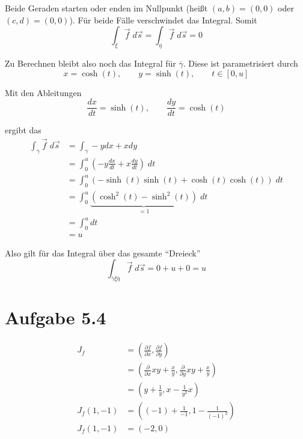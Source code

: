 \documentclass[a4paper,german,12pt,smallheadings]{scrartcl}
\begin{document}
\begin{enumerate}[(1)]
    Beide Geraden starten oder enden im Nullpunkt (heißt $(a,b) = (0,0)$ oder $(c,d) =
    (0,0)$). Für beide Fälle verschwindet das Integral. Somit
    \begin{equation*}
      \int_{\overline{\xi}} \vec{f} \; d\vec{s} = \int_{\overline{\eta}} \vec{f} \; d\vec{s} = 0
    \end{equation*}

    Zu Berechnen bleibt also noch das Integral für $\overline{\gamma}$. Diese ist parametrisiert durch
    \begin{equation*}
      x = \cosh(t),\qquad y = \sinh(t), \qquad t \in [0,u]
    \end{equation*}

    Mit den Ableitungen
    \begin{equation*}
      \frac{dx}{dt} = \sinh(t), \qquad \frac{dy}{dt} = \cosh(t)
    \end{equation*}

    ergibt das
    \begin{align*}
      \int_{\overline{\gamma}} \vec{f} \; d\vec{s} &=  \int_{\overline{\gamma}} -y dx + x dy \\ 
                                                   &= \int_0^u \left(-y \frac{dx}{dt} + x \frac{dy}{dt}\right) \; dt \\
                                                   &= \int_0^u \left(-\sinh(t) \sinh(t) + \cosh(t) \cosh(t)\right) \; dt \\
                                                   &= \int_0^u \underbrace{\left(\cosh^2(t) - \sinh^2(t)\right)}_{=1} \; dt \\
                                                   &= \int_0^u dt \\
                                                   &= u
    \end{align*}

    Also gilt für das Integral über das gesamte ``Dreieck''
    \begin{equation*}
      \int_{\overline{\gamma}\overline{\xi}\overline{\eta}} \vec{f} \; d\vec{s} = 0 + u + 0 = u
    \end{equation*}
\end{enumerate}

\section*{Aufgabe 5.4}
\begin{align*}
  J_f &= \left( \frac{\partial f}{\partial x}, \frac{\partial f}{\partial y} \right) \\
      &= \left( \frac{\partial}{\partial x} xy+\frac{x}{y}, \frac{\partial}{\partial y} xy+\frac{x}{y}\right) \\
      &= \left( y+\frac{1}{y}, x-\frac{1}{y^2}x\right) \\
  J_f(1,-1) &= \left( (-1)+\frac{1}{-1}, 1-\frac{1}{(-1)^2}\right) \\
  J_f(1,-1) &= \left( -2, 0\right) \\
\end{align*}
\end{document}
